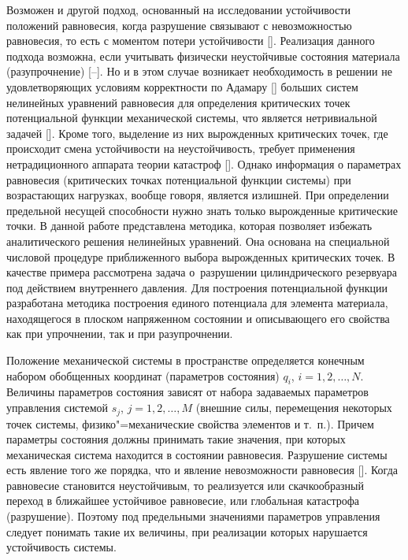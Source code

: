 Возможен и другой подход, основанный на исследовании устойчивости положений равновесия, когда разрушение связывают с невозможностью равновесия, то есть с моментом потери устойчивости []. Реализация данного подхода возможна, если учитывать физически неустойчивые состояния материала (разупрочнение) [--]. Но и в этом случае возникает необходимость в решении не удовлетворяющих условиям корректности по Адамару []  больших систем нелинейных уравнений равновесия для определения критических точек потенциальной функции механической системы, что является нетривиальной задачей []. Кроме того, выделение из них вырожденных критических точек, где происходит смена устойчивости на неустойчивость, требует применения нетрадиционного аппарата теории катастроф []. Однако информация о параметрах равновесия (критических точках потенциальной функции системы) при возрастающих нагрузках, вообще говоря, является излишней. При определении предельной несущей способности нужно знать только вырожденные критические точки. В данной работе представлена методика, которая позволяет избежать аналитического решения нелинейных уравнений. 
Она основана на специальной числовой процедуре приближенного выбора вырожденных критических точек. В качестве примера рассмотрена задача о~разрушении цилиндрического резервуара под действием внутреннего давления. Для построения потенциальной функции разработана методика построения единого потенциала для элемента материала, находящегося в плоском напряженном состоянии и описывающего его свойства как при упрочнении, так и при разупрочнении.

\smallskip

 Положение механической системы в пространстве определяется конечным набором обобщенных координат (параметров состояния)  $ q_i$, $i = 1, 2, \ldots, N $. 
Величины параметров состояния зависят от набора задаваемых параметров управления системой $ s_j$, 
$j = 1, 2, \ldots, M $ 
(внешние силы, перемещения некоторых точек системы, физико"=механические свойства элементов и т.~п.). 
Причем параметры состояния должны принимать такие значения, при которых механическая система находится в состоянии равновесия. 
Разрушение системы есть явление того же порядка, что и явление невозможности равновесия []. 
Когда равновесие становится неустойчивым, то реализуется или скачкообразный переход в ближайшее устойчивое равновесие, или глобальная катастрофа (разрушение). Поэтому под предельными значениями параметров управления следует понимать такие их величины, при реализации которых нарушается устойчивость системы.

